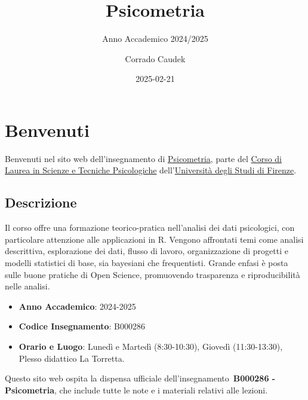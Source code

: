 \documentclass[
  letterpaper,
]{krantz}
\title{Psicometria}
\subtitle{Anno Accademico 2024/2025}
\author{Corrado Caudek}
\date{2025-02-21}
\providecommand{\tightlist}{%
  \setlength{\itemsep}{0pt}\setlength{\parskip}{0pt}}\usepackage{longtable,booktabs,array}
\renewcommand*\contentsname{Indice}
\newcommand\contentsname{Indice}
\begin{document}
\maketitle

\renewcommand*\contentsname{Indice}
{
\hypersetup{linkcolor=}
\setcounter{tocdepth}{2}
\tableofcontents
}


\chapter*{Benvenuti}\label{benvenuti}


Benvenuti nel sito web dell'insegnamento di
\href{https://www.unifi.it/index.php?module=ofform2&mode=1&cmd=3&AA=2023&afId=689762}{Psicometria},
parte del
\href{https://www.psicologia.unifi.it/vp-130-scienze-e-tecniche-psicologiche-l-24.html}{Corso
di Laurea in Scienze e Tecniche Psicologiche}
dell'\href{https://www.unifi.it/}{Università degli Studi di Firenze}.

\section*{Descrizione}\label{descrizione}


Il corso offre una formazione teorico-pratica nell'analisi dei dati
psicologici, con particolare attenzione alle applicazioni in R. Vengono
affrontati temi come analisi descrittiva, esplorazione dei dati, flusso
di lavoro, organizzazione di progetti e modelli statistici di base, sia
bayesiani che frequentisti. Grande enfasi è posta sulle buone pratiche
di Open Science, promuovendo trasparenza e riproducibilità nelle
analisi.

\begin{itemize}
\tightlist
\item
  \textbf{Anno Accademico}: 2024-2025
\item
  \textbf{Codice Insegnamento}: B000286
\item
  \textbf{Orario e Luogo}: Lunedì e Martedì (8:30-10:30), Giovedì
  (11:30-13:30), Plesso didattico La Torretta.
\end{itemize}

\begin{tcolorbox}[enhanced jigsaw, toprule=.15mm, breakable, bottomrule=.15mm, colback=white, colbacktitle=quarto-callout-note-color!10!white, left=2mm, toptitle=1mm, colframe=quarto-callout-note-color-frame, coltitle=black, opacitybacktitle=0.6, bottomtitle=1mm, titlerule=0mm, leftrule=.75mm, opacityback=0, rightrule=.15mm, title=\textcolor{quarto-callout-note-color}{\faInfo}\hspace{0.5em}{Nota}, arc=.35mm]

Questo sito web ospita la dispensa ufficiale
dell'insegnamento~\textbf{B000286 - Psicometria}, che include tutte le
note e i materiali relativi alle lezioni.

\end{tcolorbox}
\end{document}
